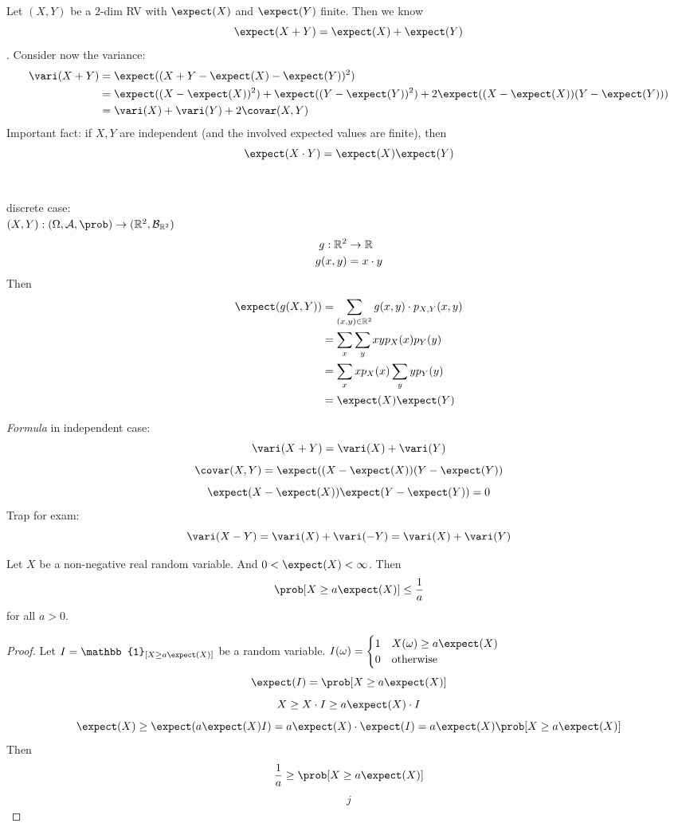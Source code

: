 \documentclass[mfit.tex]{subfiles}
\begin{document}
Let $(X,Y)$ be a $2$-dim RV with $\expect(X)$ and $\expect(Y)$ finite. Then we know
\[ \expect(X+Y) = \expect(X) + \expect(Y) \].
Consider now the variance:
\begin{align*}
  \vari(X+Y) &= \expect((X+Y - \expect(X) -\expect(Y))^2) \\
  &= \expect((X-\expect(X))^2) + \expect((Y-\expect(Y))^2) + 2 \expect((X-\expect(X))(Y-\expect(Y))) \\
  &= \vari(X) + \vari(Y) + 2 \covar(X,Y)
\end{align*}
Important fact: if $X,Y$ are independent (and the involved expected values are finite), then
\[ \expect(X \cdot Y) = \expect(X) \expect(Y) \]
\\
\\
discrete case:\\
$(X,Y): (\Omega,\mathcal{A},\prob) \to (\R^2,\mathcal{B}_{\R^2})$
\begin{align*}
  g: \mathbb{R}^2 &\to \mathbb{R} \\
  g(x,y) &= x \cdot y
\end{align*}
Then
\begin{align*}
  \expect(g(X,Y)) &= \sum_{(x,y) \in \R^2} g(x,y) \cdot p_{X,Y} (x,y) \\
  &= \sum_{x} \sum_{y} xy p_X(x) p_Y(y) \\
  &= \sum_x x p_X(x) \sum_y y p_Y(y) \\
  &= \expect(X) \expect(Y)
\end{align*}

\emph{Formula} in independent case:
\[ \vari(X+Y) = \vari(X) + \vari(Y) \]
\[ \covar(X,Y) = \expect((X-\expect(X)) (Y - \expect(Y)) \]
\[ \expect(X-\expect(X)) \expect(Y-\expect(Y)) = 0 \]
Trap for exam:
\[ \vari(X-Y) = \vari(X) + \vari(-Y)  = \vari(X) + \vari(Y) \]

\begin{lemma}
  Let $X$ be a non-negative real random variable. And $0 < \expect(X) < \infty$.
  Then
  \[ \prob[X \geq a \expect(X)] \leq \frac{1}{a} \]
  for all $a > 0$.
\end{lemma}

\begin{proof}
  Let $I = \mathbb{1}_{[X \geq a \expect(X)]}$ be a random variable.
  $I(\omega) = \begin{cases} 1 & X(\omega) \geq a \expect(X)\\ 0 & \text{otherwise} \end{cases}$
  \[ \expect(I) = \prob[X \geq a \expect(X)] \]
  \[ X \geq X \cdot I \geq a \expect(X) \cdot I \]
  \[ \expect(X) \geq \expect(a \expect(X) I) = a\expect(X) \cdot \expect(I) = a \expect(X) \prob[X \geq a \expect(X)] \]
  Then
  \[ \frac{1}{a} \geq \prob[X \geq a \expect(X)] \]
  \begin{align*}
    j
  \end{align*}
\end{proof}
\end{document}
